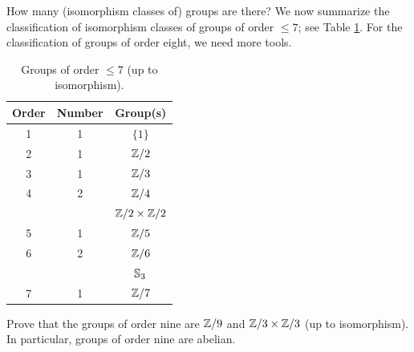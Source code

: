 How many (isomorphism classes of) groups are there? We now summarize the classification 
of isomorphism classes of groups of order $\leq7$; see
Table \ref{tab:grupos<8}. For the classification of groups
of order eight, we need more tools. 

\begin{table}[ht]
    \caption{Groups of order $\leq7$ (up to isomorphism).}

    \begin{tabular}{|c|c|c|}
    \hline
    Order & Number & Group(s)\\
    \hline
        1 & 1 & $\{1\}$ \\
        2 & 1 & $\mathbb{Z}/2$ \\
        3 & 1 & $\mathbb{Z}/3$ \\
        4 & 2 & $\mathbb{Z}/4$ \\
        && $\mathbb{Z}/2\times\mathbb{Z}/2$ \\
        5 & 1 & $\mathbb{Z}/5$ \\
        6 & 2 & $\mathbb{Z}/6$\\
        &&$\mathbb{S}_3$ \\
        7 & 1 & $\mathbb{Z}/7$ \\
    \hline
    \end{tabular}
    \label{tab:grupos<8}
\end{table}

\begin{exercise}
\label{xca:size9}
Prove that the groups of order nine are 
$\mathbb{Z}/9$ and $\mathbb{Z}/3\times\mathbb{Z}/3$ (up to isomorphism). In particular, groups of order
nine are abelian. 
\end{exercise}


